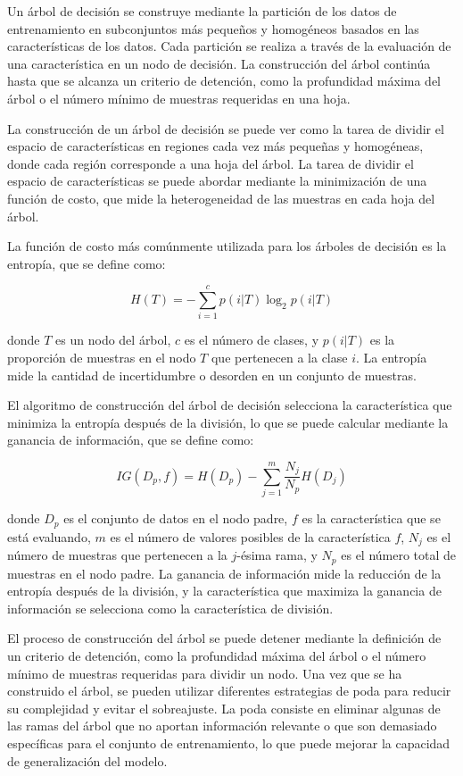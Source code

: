 \documentclass[a4paper,12pt]{article}
\begin{document}
Un árbol de decisión se construye mediante la partición de los datos de entrenamiento en subconjuntos más pequeños y homogéneos basados en las características de los datos. Cada partición se realiza a través de la evaluación de una característica en un nodo de decisión. La construcción del árbol continúa hasta que se alcanza un criterio de detención, como la profundidad máxima del árbol o el número mínimo de muestras requeridas en una hoja.

La construcción de un árbol de decisión se puede ver como la tarea de dividir el espacio de características en regiones cada vez más pequeñas y homogéneas, donde cada región corresponde a una hoja del árbol. La tarea de dividir el espacio de características se puede abordar mediante la minimización de una función de costo, que mide la heterogeneidad de las muestras en cada hoja del árbol.

La función de costo más comúnmente utilizada para los árboles de decisión es la entropía, que se define como:

$$ H(T) = - \sum_{i=1}^{c} p(i|T) \log_2 p(i|T) $$

donde $T$ es un nodo del árbol, $c$ es el número de clases, y $p(i|T)$ es la proporción de muestras en el nodo $T$ que pertenecen a la clase $i$. La entropía mide la cantidad de incertidumbre o desorden en un conjunto de muestras.

El algoritmo de construcción del árbol de decisión selecciona la característica que minimiza la entropía después de la división, lo que se puede calcular mediante la ganancia de información, que se define como:

$$ IG(D_p, f) = H(D_p) - \sum_{j=1}^{m} \frac{N_j}{N_p} H(D_j) $$

donde $D_p$ es el conjunto de datos en el nodo padre, $f$ es la característica que se está evaluando, $m$ es el número de valores posibles de la característica $f$, $N_j$ es el número de muestras que pertenecen a la $j$-ésima rama, y $N_p$ es el número total de muestras en el nodo padre. La ganancia de información mide la reducción de la entropía después de la división, y la característica que maximiza la ganancia de información se selecciona como la característica de división.

El proceso de construcción del árbol se puede detener mediante la definición de un criterio de detención, como la profundidad máxima del árbol o el número mínimo de muestras requeridas para dividir un nodo. Una vez que se ha construido el árbol, se pueden utilizar diferentes estrategias de poda para reducir su complejidad y evitar el sobreajuste. La poda consiste en eliminar algunas de las ramas del árbol que no aportan información relevante o que son demasiado específicas para el conjunto de entrenamiento, lo que puede mejorar la capacidad de generalización del modelo.
\end{document}
